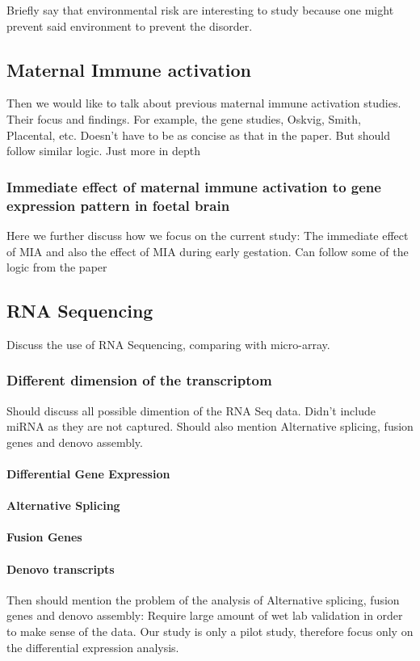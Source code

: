 Briefly say that environmental risk are interesting to study because one might prevent said environment to prevent the disorder. 
\subsection{Maternal Immune activation}
Then we would like to talk about previous maternal immune activation studies. 
Their focus and findings. 
For example, the  gene studies, Oskvig, Smith, Placental, etc. 
Doesn't have to be as concise as that in the paper. 
But should follow similar logic. Just more in depth
\subsubsection{Immediate effect of maternal immune activation to gene expression pattern in foetal brain}
Here we further discuss how we focus on the current study: The immediate effect of MIA and also the effect of MIA during early gestation. 
Can follow some of the logic from the paper

\subsection{RNA Sequencing}
Discuss the use of RNA Sequencing, comparing with micro-array. 
\subsubsection{Different dimension of the transcriptom}
Should discuss all possible dimention of the RNA Seq data. 
Didn't include miRNA as they are not captured.
Should also mention Alternative splicing, fusion genes and denovo assembly.
\paragraph{Differential Gene Expression}
\paragraph{Alternative Splicing}
\paragraph{Fusion Genes}
\paragraph{Denovo transcripts}
Then should mention the problem of the analysis of Alternative splicing, fusion genes and denovo assembly:
Require large amount of wet lab validation in order to make sense of the data.
Our study is only a pilot study, therefore focus only on the differential expression analysis. 
